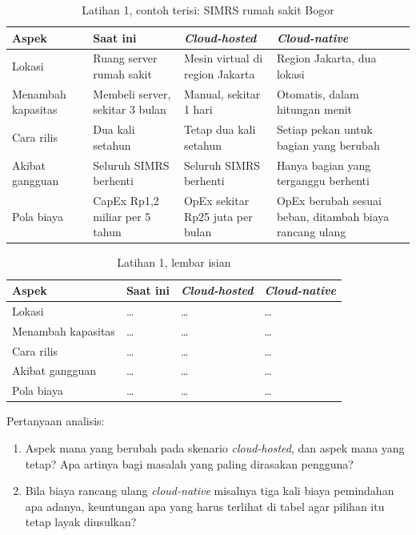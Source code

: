 \begin{table}[!htb]
  \centering
  \footnotesize
  \caption{Latihan 1, contoh terisi: SIMRS rumah sakit Bogor}
  \label{tab:ch01-lat1-contoh}
  \begin{tabularx}{\textwidth}{P{2cm}LLL}
    \hline
    \textbf{Aspek} & \textbf{Saat ini} & \textbf{\textit{Cloud-hosted}} &
      \textbf{\textit{Cloud-native}} \\
    \hline
    Lokasi & Ruang server rumah sakit & Mesin virtual di region Jakarta & Region
      Jakarta, dua lokasi \\
    \hline
    Menambah kapasitas & Membeli server, sekitar 3 bulan & Manual, sekitar 1 hari &
      Otomatis, dalam hitungan menit \\
    \hline
    Cara rilis & Dua kali setahun & Tetap dua kali setahun & Setiap pekan untuk bagian
      yang berubah \\
    \hline
    Akibat gangguan & Seluruh SIMRS berhenti & Seluruh SIMRS berhenti & Hanya bagian
      yang terganggu berhenti \\
    \hline
    Pola biaya & CapEx Rp1,2 miliar per 5 tahun & OpEx sekitar Rp25 juta per bulan &
      OpEx berubah sesuai beban, ditambah biaya rancang ulang \\
    \hline
  \end{tabularx}
\end{table}

\begin{table}[!htb]
  \centering
  \footnotesize
  \caption{Latihan 1, lembar isian}
  \label{tab:ch01-lat1-hasil}
  \begin{tabularx}{\textwidth}{P{2cm}LLL}
    \hline
    \textbf{Aspek} & \textbf{Saat ini} & \textbf{\textit{Cloud-hosted}} &
      \textbf{\textit{Cloud-native}} \\
    \hline
    Lokasi & \dots & \dots & \dots \\
    \hline
    Menambah kapasitas & \dots & \dots & \dots \\
    \hline
    Cara rilis & \dots & \dots & \dots \\
    \hline
    Akibat gangguan & \dots & \dots & \dots \\
    \hline
    Pola biaya & \dots & \dots & \dots \\
    \hline
  \end{tabularx}
\end{table}

Pertanyaan analisis:
\begin{enumerate}
  \item Aspek mana yang berubah pada skenario \textit{cloud-hosted}, dan aspek mana yang
        tetap? Apa artinya bagi masalah yang paling dirasakan pengguna?
  \item Bila biaya rancang ulang \textit{cloud-native} misalnya tiga kali biaya
        pemindahan apa adanya, keuntungan apa yang harus terlihat di tabel agar pilihan
        itu tetap layak diusulkan?
\end{enumerate}

